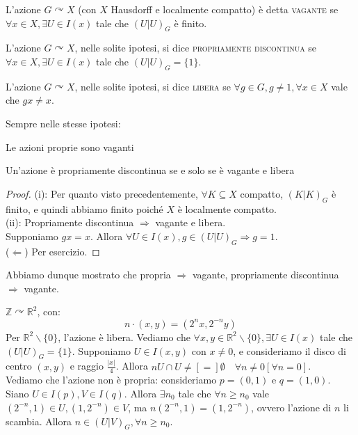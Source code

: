 \begin{defn}
L'azione $G \curvearrowright X$ (con $X$ Hausdorff e localmente compatto) è detta \textsc{vagante} se $\forall x \in X, \exists U \in I(x)$ tale che $(U|U)_G$ è finito.
\end{defn}

\begin{defn}
L'azione $G \curvearrowright X$, nelle solite ipotesi, si dice \textsc{propriamente discontinua} se $\forall x \in X, \exists U \in I(x)$ tale che $(U|U)_G=\{1\}$.
\end{defn}

\begin{defn}
L'azione $G \curvearrowright X$, nelle solite ipotesi, si dice \textsc{libera} se $\forall g 	\in G,g \neq 1, \forall x \in X$ vale che $gx \neq x$.
\end{defn}

\begin{prop}
Sempre nelle stesse ipotesi:
\begin{nlist}
\item Le azioni proprie sono vaganti
\item Un'azione è propriamente discontinua se e solo se è vagante e libera
\end{nlist}
\end{prop}

\begin{proof}
(i): Per quanto visto precedentemente, $\forall K \subseteq X$ compatto, $(K|K)_G$ è finito, e quindi abbiamo finito poiché $X$ è localmente compatto.\\
(ii): Propriamente discontinua $\Longrightarrow$ vagante e libera.\\
Supponiamo $gx=x$. Allora $\forall U \in I(x), g \in (U|U)_G \Longrightarrow g=1$.\\
($\Longleftarrow$) Per esercizio.
\end{proof}

\begin{oss}
Abbiamo dunque mostrato che propria $\Longrightarrow$ vagante, propriamente discontinua $\Longrightarrow$ vagante.
\end{oss}

\begin{ex}
$\mathbb{Z} \curvearrowright \mathbb{R}^2$, con:
$$n \cdot (x,y)=(2^nx,2^{-n}y)$$
Per $\mathbb{R}^2 \smallsetminus \{0\}$, l'azione è libera. Vediamo che $\forall x,y \in \mathbb{R}^2 \smallsetminus \{0\}, \exists U \in I(x)$ tale che $(U|U)_G=\{1\}$. Supponiamo $U \in I(x,y)$ con $x \neq 0$, e consideriamo il disco di centro $(x,y)$ e raggio $\frac{|x|}{4}$. Allora $nU \cap U \neq [=] \emptyset \quad \forall n \neq 0 [\forall n=0]$.\\
Vediamo che l'azione non è propria: consideriamo $p=(0,1)$ e $q=(1,0)$. Siano $U \in I(p), V \in I(q)$. Allora $\exists n_0$ tale che $\forall n \ge n_0$ vale $(2^{-n},1) \in U, (1,2^{-n}) \in V$, ma $n(2^{-n},1)=(1,2^{-n})$, ovvero l'azione di $n$ li scambia. Allora $n \in (U|V)_G, \forall n \ge n_0$.
\end{ex}

